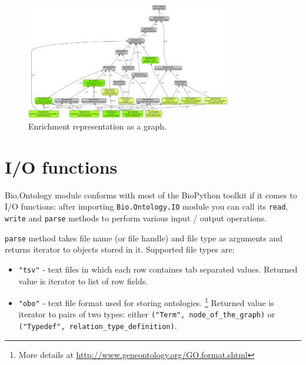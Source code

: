 \documentclass{report}
\begin{document}
\begin{htmlonly}
\label{fig:graphoutput}
\end{htmlonly}

\begin{latexonly}
\begin{figure}[htbp]
\centering
\includegraphics[width=0.8\textwidth]{images/tin_l_gene_ids.png}
\caption{Enrichment representation as a graph.}
\label{fig:graphoutput}
\end{figure}
\end{latexonly}

\section{I/O functions}

Bio.Ontology module conforms with most of the BioPython toolkit if it comes to
I/O functions: after importing \verb|Bio.Ontology.IO| module you can call its
\verb|read|, \verb|write| and \verb|parse| methods to
perform various input / output operations.

\verb|parse| method takes file name (or file handle) and file type as arguments
and returns iterator to objects stored in it.
Supported file types are:
\begin{itemize}
\item \verb|"tsv"| - text files in which each row containes tab separated values. Returned
value is iterator to list of row fields.
\item \verb|"obo"| - text file format used for storing ontologies. \footnote{More details at
\url{http://www.geneontology.org/GO.format.shtml}}
Returned value is iterator to pairs of two types: either
\verb|("Term", node_of_the_graph)| or \verb|("Typedef", relation_type_definition)|.
\end{itemize}
\end{document}
